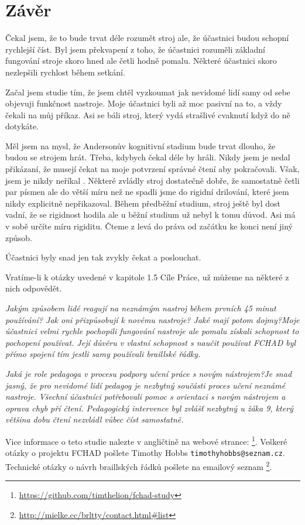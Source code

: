 \chapter{Závěr}
Čekal jsem, že to bude trvat déle rozumět stroj ale, že účastnici budou schopní rychlejší číst. Byl jsem překvapení z toho, že účastnici rozuměli základní fungování stroje skoro hned ale četli hodně pomalu. Některé účastnici skoro nezlepšili rychlost během setkání.

Začal jsem studie tím, že jsem chtěl vyzkoumat jak nevidomé lidí samy od sebe objevuji funkčnost nastroje. Moje účastnici byli až moc pasivní na to, a vždy čekali na můj příkaz. Asi se báli stroj, který vydá strašlivé cvaknutí když do ně dotykáte.

Měl jsem na mysl, že Andersonův kognitivní stadium bude trvat dlouho, že budou se strojem hrát. Třeba, kdybych čekal déle by hráli. Nikdy jsem je nedal přikázaní, že musejí čekat na moje potvrzení správné čtení aby pokračovali. Však, jsem je nikdy neříkal . Některé zvládly stroj dostatečně dobře, že samostatně četli par písmen ale do větší míru než ne spadli jsme do rigidní drilování, které jsem nikdy explicitně nepřikazoval. Během předběžní studium, stroj ještě byl dost vadní, že se rigidnost hodila ale u běžní studium už nebyl k tomu důvod. Asi  má v sobě určíte míru rigiditu. Čteme z levá do práva od začátku ke konci není jiný způsob.

Účastnici byly snad jen tak zvykly čekat a poslouchat.

Vratíme-li k otázky uvedené v kapitole 1.5 Cíle Práce, už můžeme na některé z nich odpovědět.

\em Jakým způsobem lidé reagují na neznámým nastroj během prvních 45 minut používání? Jak oni přizpůsobují k novému nastroje? Jaké mají potom dojmy?\em  Moje účastnici velmi rychle pochopili fungování nastroje ale pomalu získali schopnost to pochopení používat.  Její důvěru v vlastní schopnost s naučit používat FCHAD byl přímo spojení tím jestli samy používali braillské řádky.

\em Jaká je role pedagoga v procesu podpory učení práce s novým nástrojem?\em Je snad jasný, že pro nevidomé lidí pedagog je nezbytný součásti proces učení neznámé nastroje.  Všechní účastníci potřebovali pomoc s orientaci s novým nástrojem a oprava chyb pří čtení.  Pedagogický intervence byl zvlášť nezbytný u žáka 9, který většina dobu čtení nezvládl vůbec číst samostatně.

Vice informace o teto studie nalezte v angličtině na webové strance: \footnote{\url{https://github.com/timthelion/fchad-study}}.  Veškeré otázky o projektu FCHAD pošlete Timothy Hobbs {\tt timothyhobbs@seznam.cz}.  Technické otázky o návrh braillských řádků pošlete na emailový seznam
\footnote{\url{ http://mielke.cc/brltty/contact.html#list}}.


